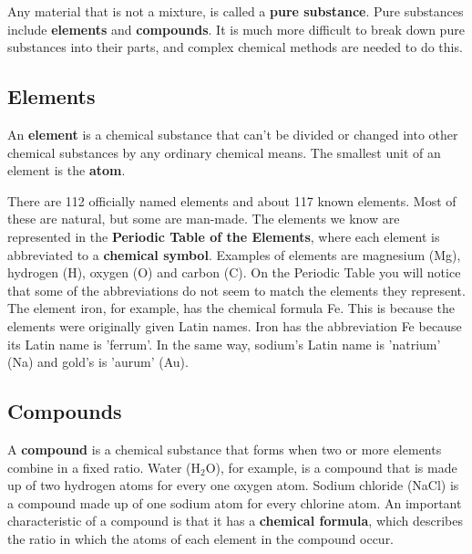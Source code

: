 Any material that is not a mixture, is called a \textbf{pure substance}. Pure substances include \textbf{elements} and \textbf{compounds}. It is much more difficult to break down pure substances into their parts, and complex chemical methods are needed to do this.

\subsection{Elements}

An \textbf{element} is a chemical substance that can't be divided or changed into other chemical substances by any ordinary chemical means. The smallest unit of an element is the \textbf{atom}. 


There are 112 officially named elements and about 117 known elements. Most of these are natural, but some are man-made. The elements we know are represented in the \textbf{Periodic Table of the Elements}, where each element is abbreviated to a \textbf{chemical symbol}. Examples of elements are magnesium (Mg), hydrogen (H), oxygen (O) and carbon (C). On the Periodic Table you will notice that some of the abbreviations do not seem to match the elements they represent. The element iron, for example, has the chemical formula Fe. This is because the elements were originally given Latin names. Iron has the abbreviation Fe because its Latin name is 'ferrum'. In the same way, sodium's Latin name is 'natrium' (Na) and gold's is 'aurum' (Au).

\subsection{Compounds}

A \textbf{compound} is a chemical substance that forms when two or more elements combine in a fixed ratio. Water (H$_{2}$O), for example, is a compound that is made up of two hydrogen atoms for every one oxygen atom. Sodium chloride (NaCl) is a compound made up of one sodium atom for every chlorine atom. An important characteristic of a compound is that it has a \textbf{chemical formula}, which describes the ratio in which the atoms of each element in the compound occur.


